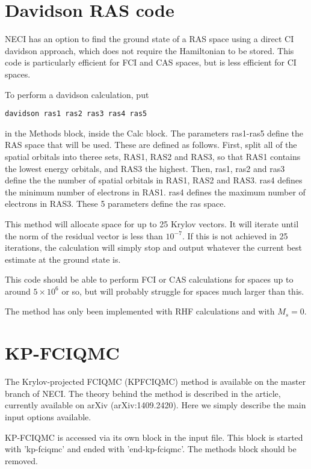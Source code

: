 \documentclass[a4paper,notitlepage]{scrreprt}
\begin{document}
\section{Davidson RAS code}

    NECI has an option to find the ground state of a RAS space using a
    direct CI davidson approach, which does not require the Hamiltonian to be
    stored. This code is particularly efficient for FCI and CAS spaces, but is
    less efficient for CI spaces.

    To perform a davidson calculation, put
    \begin{lstlisting}[gobble=4]
    	davidson ras1 ras2 ras3 ras4 ras5
    \end{lstlisting}
    in the Methods block, inside the Calc block. The parameters ras1-ras5 define
    the RAS space that will be used. These are defined as follows. First,
    split all of the spatial orbitals into theree sets, RAS1, RAS2 and RAS3,
    so that RAS1 contains the lowest energy orbitals, and RAS3 the highest.
    Then, ras1, ras2 and ras3 define the the number of spatial orbitals in
    RAS1, RAS2 and RAS3. ras4 defines the minimum number of electrons in RAS1.
    ras4 defines the maximum number of electrons in RAS3. These 5 parameters
    define the ras space.

    This method will allocate space for up to 25 Krylov vectors. It will iterate
    until the norm of the residual vector is less than $10^{-7}$. If this is
    not achieved in 25 iterations, the calculation will simply stop and output
    whatever the current best estimate at the ground state is.

    This code should be able to perform FCI or CAS calculations for spaces up
    to around $5\times10^6$ or so, but will probably struggle for spaces much
    larger than this.

    The method has only been implemented with RHF calculations and with $M_s=0$.

\section{KP-FCIQMC}

    The Krylov-projected FCIQMC (KPFCIQMC) method is available on the master
    branch of NECI. The theory behind the method is described in the article,
    currently available on arXiv (arXiv:1409.2420). Here we simply describe the
    main input options available.

    KP-FCIQMC is accessed via its own block in the input file. This block is
    started with 'kp-fciqmc' and ended with 'end-kp-fciqmc'. The methods block
    should be removed.
\end{document}

